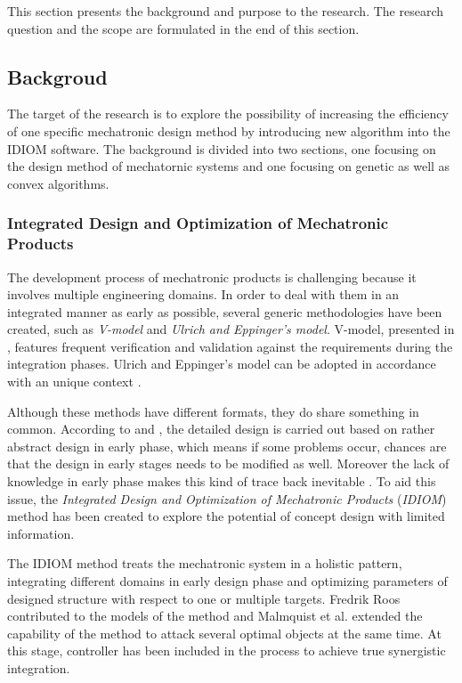 This section presents the background and purpose to the research. The research question and the scope are formulated in the end of this section.

\subsection{Backgroud}
The target of the research is to explore the possibility of increasing the efficiency of one specific mechatronic design method by introducing new algorithm into the IDIOM software. The background is divided into two sections, one focusing on the design method of mechatornic systems and one focusing on genetic as well as convex algorithms.

\subsubsection{Integrated Design and Optimization of Mechatronic Products}
The development process of mechatronic products is challenging because it involves multiple engineering domains. In order to deal with them in an integrated manner as early as possible, several generic methodologies have been created, such as \textit{V-model} and \textit{Ulrich and Eppinger's model}. V-model, presented in \cite{VDI}, features frequent verification and validation against the requirements during the integration phases. Ulrich and Eppinger's model can be adopted in accordance with an unique context \cite{Ulrich}.

Although these methods have different formats, they do share something in common. According to \cite{VDI} and \cite{Ulrich}, the detailed design is carried out based on rather abstract design in early phase, which means if some problems occur, chances are that the design in early stages needs to be modified as well. Moreover the lack of knowledge in early phase makes this kind of trace back inevitable \cite{Holistic}. To aid this issue, the \textit{Integrated Design and Optimization of Mechatronic Products} (\textit{IDIOM}) method has been created to explore the potential of concept design with limited information.

The IDIOM method treats the mechatronic system in a holistic pattern,  integrating different domains in early design phase and optimizing parameters of designed structure with respect to one or multiple targets. Fredrik Roos contributed to the models of the method \cite{Roos} and Malmquist et al. extended the capability of the method to attack several optimal objects at the same time. At this stage, controller has been included in the process to achieve true synergistic integration.

